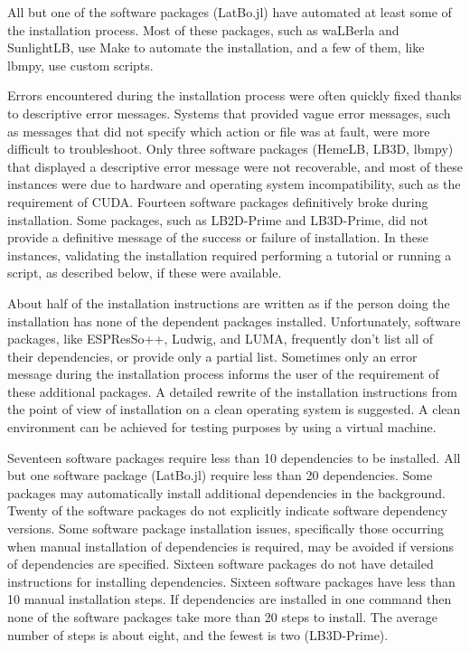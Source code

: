 \documentclass[final, 3p, times, authoryear]{elsarticle}
\begin{document}
All but one of the software packages (LatBo.jl) have automated at least some of
the installation process. Most of these packages, such as waLBerla and
SunlightLB, use Make to automate the installation, and a few of them, like
lbmpy, use custom scripts.

Errors encountered during the installation process were often quickly fixed
thanks to descriptive error messages. Systems that provided vague error
messages, such as messages that did not specify which action or file was at
fault, were more difficult to troubleshoot. Only three software packages
(HemeLB, LB3D, lbmpy) that displayed a descriptive error message were not
recoverable, and most of these instances were due to hardware and operating
system incompatibility, such as the requirement of CUDA. Fourteen software
packages definitively broke during installation. Some packages, such as
LB2D-Prime and LB3D-Prime, did not provide a definitive message of the success
or failure of installation. In these instances, validating the installation
required performing a tutorial or running a script, as described below, if these
were available. 

About half of the installation instructions are written as if the person doing
the installation has none of the dependent packages installed. Unfortunately,
software packages, like ESPResSo++, Ludwig, and LUMA, frequently don't list all
of their dependencies, or provide only a partial list. Sometimes only an error
message during the installation process informs the user of the requirement of
these additional packages. A detailed rewrite of the installation instructions
from the point of view of installation on a clean operating system is suggested.
A clean environment can be achieved for testing purposes by using a virtual
machine.

Seventeen software packages require less than 10 dependencies to be installed. All but one software package (LatBo.jl) require less than 20 dependencies. Some
packages may automatically install additional dependencies in the background.
Twenty of the software packages do not explicitly indicate software dependency
versions. Some software package installation issues, specifically those
occurring when manual installation of dependencies is required, may be avoided
if versions of dependencies are specified. Sixteen software packages do not have
detailed instructions for installing dependencies. Sixteen software packages
have less than 10 manual installation steps. If dependencies are installed in
one command then none of the software packages take more than 20 steps to
install. The average number of steps is about eight, and the fewest is two
(LB3D-Prime). 
\end{document}
